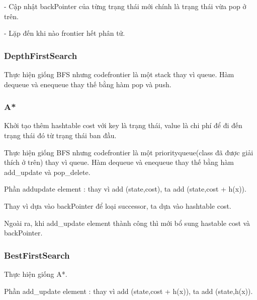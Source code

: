 \documentclass[11pt]{scrartcl} %
\begin{document}
- Cập nhật backPointer của từng trạng thái mới chính là trạng thái vừa pop ở trên.

- Lặp đến khi nào frontier hết phân tử.

\subsubsection{DepthFirstSearch}

Thực hiện giống BFS nhưng code{frontier} là một stack thay vì queue. Hàm dequeue và enequeue thay thế bằng hàm pop và push.

\subsubsection{A*}
Khởi tạo thêm hashtable cost với key là trạng thái, value là chi phí để đi đến trạng thái đó từ trạng thái ban đầu.

Thực hiện giống BFS nhưng code{frontier} là một priorityqueue(class đã được giải thích ở trên) thay vì queue. Hàm dequeue và enequeue thay thế bằng hàm add\_update và pop\_delete.

Phần addupdate element : thay vì add (state,cost), ta add (state,cost + h(x)).

Thay vì dựa vào backPointer để loại successor, ta dựa vào hashtable cost.

Ngoài ra, khi add\_update element thành công thì mới bổ sung hastable cost và backPointer.



\subsubsection{BestFirstSearch}
Thực hiện giống A*.

Phần add\_update element : thay vì add (state,cost + h(x)), ta add (state,h(x)).




\end{document}
